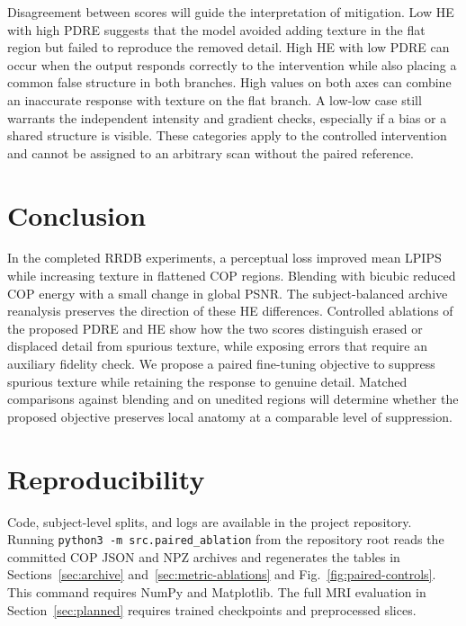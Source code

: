 \documentclass[journal]{IEEEtran}
\begin{document}
Disagreement between scores will guide the interpretation of mitigation. Low HE with high PDRE suggests that the model avoided adding texture in the flat region but failed to reproduce the removed detail. High HE with low PDRE can occur when the output responds correctly to the intervention while also placing a common false structure in both branches. High values on both axes can combine an inaccurate response with texture on the flat branch. A low-low case still warrants the independent intensity and gradient checks, especially if a bias or a shared structure is visible. These categories apply to the controlled intervention and cannot be assigned to an arbitrary scan without the paired reference.

\section{Conclusion}
In the completed RRDB experiments, a perceptual loss improved mean LPIPS while increasing texture in flattened COP regions. Blending with bicubic reduced COP energy with a small change in global PSNR. The subject-balanced archive reanalysis preserves the direction of these HE differences. Controlled ablations of the proposed PDRE and HE show how the two scores distinguish erased or displaced detail from spurious texture, while exposing errors that require an auxiliary fidelity check. We propose a paired fine-tuning objective to suppress spurious texture while retaining the response to genuine detail. Matched comparisons against blending and on unedited regions will determine whether the proposed objective preserves local anatomy at a comparable level of suppression.

\section*{Reproducibility}
Code, subject-level splits, and logs are available in the project repository. Running \texttt{python3 -m src.paired\_ablation} from the repository root reads the committed COP JSON and NPZ archives and regenerates the tables in Sections~\ref{sec:archive} and~\ref{sec:metric-ablations} and Fig.~\ref{fig:paired-controls}. This command requires NumPy and Matplotlib. The full MRI evaluation in Section~\ref{sec:planned} requires trained checkpoints and preprocessed slices.



\end{document}
